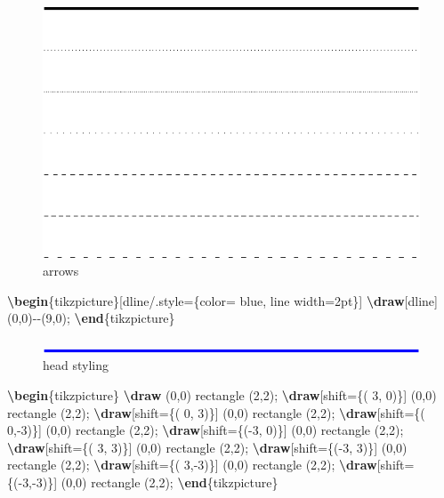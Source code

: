 \documentclass[
]{book}
\newenvironment{Shaded}{\begin{snugshade}}{\end{snugshade}}
\newcommand{\ExtensionTok}[1]{#1}
\newcommand{\FunctionTok}[1]{\textcolor[rgb]{0.13,0.29,0.53}{\textbf{#1}}}
\newcommand{\KeywordTok}[1]{\textcolor[rgb]{0.13,0.29,0.53}{\textbf{#1}}}
\newcommand{\NormalTok}[1]{#1}
\theoremstyle{definition}
\theoremstyle{definition}
\theoremstyle{definition}
\theoremstyle{definition}
\theoremstyle{remark}
\begin{document}
\begin{figure}
\includegraphics[width=0.75\linewidth]{202401311000-TikZ_files/figure-latex/unnamed-chunk-39-1} \caption{arrows}\label{fig:unnamed-chunk-39}
\end{figure}

\begin{Shaded}
\begin{Highlighting}[]
\KeywordTok{\textbackslash{}begin}\NormalTok{\{}\ExtensionTok{tikzpicture}\NormalTok{\}[dline/.style=\{color= blue, line width=2pt\}]}
  \FunctionTok{\textbackslash{}draw}\NormalTok{[dline] (0,0){-}{-}(9,0); }
\KeywordTok{\textbackslash{}end}\NormalTok{\{}\ExtensionTok{tikzpicture}\NormalTok{\}}
\end{Highlighting}
\end{Shaded}

\begin{figure}
\includegraphics[width=0.75\linewidth]{202401311000-TikZ_files/figure-latex/unnamed-chunk-41-1} \caption{head styling}\label{fig:unnamed-chunk-41}
\end{figure}

\begin{Shaded}
\begin{Highlighting}[]
\KeywordTok{\textbackslash{}begin}\NormalTok{\{}\ExtensionTok{tikzpicture}\NormalTok{\}}
  \FunctionTok{\textbackslash{}draw}\NormalTok{ (0,0) rectangle (2,2);}
  \FunctionTok{\textbackslash{}draw}\NormalTok{[shift=\{( 3, 0)\}] (0,0) rectangle (2,2);}
  \FunctionTok{\textbackslash{}draw}\NormalTok{[shift=\{( 0, 3)\}] (0,0) rectangle (2,2);}
  \FunctionTok{\textbackslash{}draw}\NormalTok{[shift=\{( 0,{-}3)\}] (0,0) rectangle (2,2);}
  \FunctionTok{\textbackslash{}draw}\NormalTok{[shift=\{({-}3, 0)\}] (0,0) rectangle (2,2);}
  \FunctionTok{\textbackslash{}draw}\NormalTok{[shift=\{( 3, 3)\}] (0,0) rectangle (2,2);}
  \FunctionTok{\textbackslash{}draw}\NormalTok{[shift=\{({-}3, 3)\}] (0,0) rectangle (2,2);}
  \FunctionTok{\textbackslash{}draw}\NormalTok{[shift=\{( 3,{-}3)\}] (0,0) rectangle (2,2);}
  \FunctionTok{\textbackslash{}draw}\NormalTok{[shift=\{({-}3,{-}3)\}] (0,0) rectangle (2,2);}
\KeywordTok{\textbackslash{}end}\NormalTok{\{}\ExtensionTok{tikzpicture}\NormalTok{\}}
\end{Highlighting}
\end{Shaded}
\end{document}
